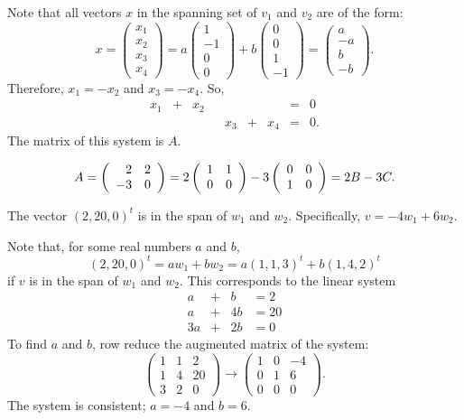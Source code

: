 \documentclass{ximera}
\begin{document}
\soln Note that all vectors $x$ in the spanning set of $v_1$ and $v_2$
are of the form:
\[
x = \left(\begin{array}{r} x_1 \\ x_2 \\ x_3 \\ x_4
\end{array}\right)
= a\left(\begin{array}{r} 1 \\ -1 \\ 0 \\ 0 \end{array}\right) + 
b\left(\begin{array}{r} 0 \\ 0 \\ 1 \\ -1 \end{array}\right) =
\left(\begin{array}{r} a \\ -a \\ b \\ -b \end{array}\right).
\]
Therefore, $x_1 = -x_2$ and $x_3 = -x_4$.  So,
\[
\begin{array}{rrrrrrrrl}
x_1 & + & x_2 & & & & & = & 0 \\
& & & & x_3 & + & x_4 & = & 0. \end{array}
\]
The matrix of this system is $A$.

\[ A = \left(\begin{array}{rr} 2 & 2\\ -3 &0\end{array}\right) = 2\left(\begin{array}{rr} 1 & 1\\ 0 &0\end{array}\right) -
3\left(\begin{array}{rr} 0 & 0\\ 1 &0\end{array}\right) = 2B - 3C. \]

\ans The vector $(2,20,0)^t$ is in the span of $w_1$ and $w_2$. 
Specifically, $v = -4w_1 + 6w_2$.

\soln Note that, for some real numbers $a$ and $b$,
\[
(2,20,0)^t = aw_1 + bw_2 = a(1,1,3)^t + b(1,4,2)^t
\]
if $v$ is in the span of $w_1$ and $w_2$.
This corresponds to the linear system
\[
\begin{array}{rrrrr}
a & + & b & = 2 \\
a & + & 4b & = 20 \\
3a & + & 2b & = 0 \end{array}
\]
To find $a$ and $b$, row reduce the augmented matrix of the system:
\[
\left(\begin{array}{rr|r} 1 & 1 & 2 \\ 1 & 4 & 20 \\
3 & 2 & 0 \end{array}\right) \longrightarrow
\left(\begin{array}{rr|r} 1 & 0 & -4 \\ 0 & 1 & 6 \\
0 & 0 & 0 \end{array}\right).
\]
The system is consistent; $a = -4$ and $b = 6$.
\end{document}
